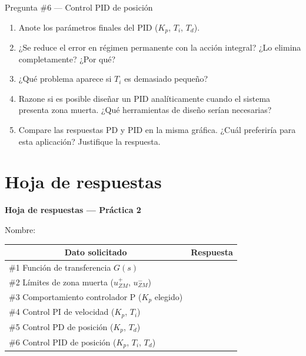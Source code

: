 \documentclass[12pt,a4paper]{article}
\begin{document}
\begin{pregunta}{Pregunta \#6 — Control PID de posición}
  \begin{enumerate}[label=\alph*)]
    \item Anote los parámetros finales del PID ($K_p$, $T_i$, $T_d$).
    \item ¿Se reduce el error en régimen permanente con la acción integral?
          ¿Lo elimina completamente? ¿Por qué?
    \item ¿Qué problema aparece si $T_i$ es demasiado pequeño?
    \item Razone si es posible diseñar un PID analíticamente cuando el sistema
          presenta zona muerta. ¿Qué herramientas de diseño serían necesarias?
    \item Compare las respuestas PD y PID en la misma gráfica.
          ¿Cuál preferiría para esta aplicación? Justifique la respuesta.
  \end{enumerate}
\end{pregunta}

\section*{Hoja de respuestas}

\begin{center}
{\large\bfseries Hoja de respuestas — Práctica 2}
\end{center}

Nombre: \underline{\hspace{8cm}}

\vspace{6pt}

\begin{tabular}{|p{5.5cm}|p{8.5cm}|}
\hline
\multicolumn{1}{|c|}{\textbf{Dato solicitado}} &
\multicolumn{1}{c|}{\textbf{Respuesta}} \\
\hline
\#1 Función de transferencia $G(s)$ &
\vspace{2.5cm} \\
\hline
\#2 Límites de zona muerta ($u_{ZM}^+$, $u_{ZM}^-$) &
\vspace{2.5cm} \\
\hline
\#3 Comportamiento controlador P ($K_p$ elegido) &
\vspace{2.5cm} \\
\hline
\#4 Control PI de velocidad ($K_p$, $T_i$) &
\vspace{2.5cm} \\
\hline
\#5 Control PD de posición ($K_p$, $T_d$) &
\vspace{2.5cm} \\
\hline
\#6 Control PID de posición ($K_p$, $T_i$, $T_d$) &
\vspace{3.0cm} \\
\hline
\end{tabular}
\end{document}
